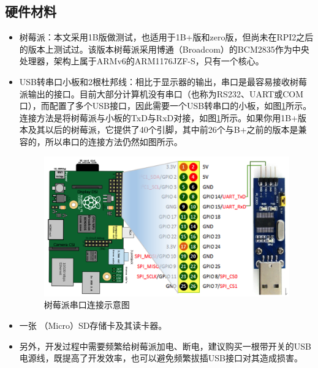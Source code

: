 \documentclass[main.tex]{subfiles}
\begin{document}
\begin{CJK*}{UTF8}{song}
\subsection{硬件材料}
\begin{itemize}
\item 树莓派：本文采用1B版做测试，也适用于1B+版和zero版，但尚未在RPI2之后的版本上测试过。该版本树莓派采用博通（Broadcom）的BCM2835作为中央处理器，架构上属于ARMv6的ARM1176JZF-S，只有一个核心。

\item USB转串口小板和2根杜邦线：相比于显示器的输出，串口是最容易接收树莓派输出的接口。目前大部分计算机没有串口（也称为RS232、UART或COM口），而配置了多个USB接口，因此需要一个USB转串口的小板，如图\ref{figure:1-1}所示。连接方法是将树莓派与小板的TxD与RxD对接，如图\ref{figure:1-1}所示。如果你用1B+版本及其以后的树莓派，它提供了40个引脚，其中前26个与B+之前的版本是兼容的，所以串口的连接方法仍然如图所示。

\begin{figure}[htp]
\centering
\includegraphics[scale=0.2]{figures/1-1.png}
\caption{树莓派串口连接示意图}
\label{figure:1-1}
\end{figure}

\item 一张 （Micro）SD存储卡及其读卡器。

\item 另外，开发过程中需要频繁给树莓派加电、断电，建议购买一根带开关的USB电源线，既提高了开发效率，也可以避免频繁拔插USB接口对其造成损害。
\end{itemize}


\end{CJK*}
\end{document}

